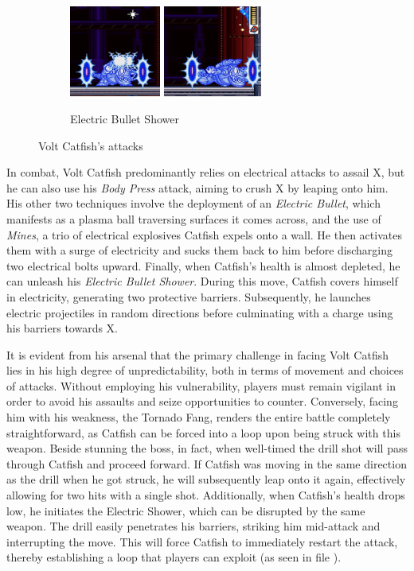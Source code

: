 \begin{figure}[htp]
	\begin{subfigure}{\linewidth}
		\centering
		\includegraphics[height=3cm]{figures/X3/Volt_catfish/catfish_dm_1.jpg}
		\includegraphics[height=3cm]{figures/X3/Volt_catfish/catfish_dm_2.jpg}
		\caption{Electric Bullet Shower}
	\end{subfigure}
	\caption{Volt Catfish's attacks}
	\end{figure}
	
In combat, Volt Catfish predominantly relies on electrical attacks to assail X, but he can also use his \emph{Body Press} attack, aiming to crush X by leaping onto him. His other two techniques involve the deployment of an \emph{Electric Bullet}, which manifests as a plasma ball traversing surfaces it comes across, and the use of \emph{Mines}, a trio of electrical explosives Catfish expels onto a wall. He then activates them with a surge of electricity and sucks them back to him before discharging two electrical bolts upward. Finally, when Catfish's health is almost depleted, he can unleash his \emph{Electric Bullet Shower}. During this move, Catfish covers himself in electricity, generating two protective barriers. Subsequently, he launches electric projectiles in random directions before culminating with a charge using his barriers towards X.


It is evident from his arsenal that the primary challenge in facing Volt Catfish lies in his high degree of unpredictability, both in terms of movement and choices of attacks. Without employing his vulnerability, players must remain vigilant in order to avoid his assaults and seize opportunities to counter. Conversely, facing him with his weakness, the Tornado Fang, renders the entire battle completely straightforward, as Catfish can be forced into a loop upon being struck with this weapon. Beside stunning the boss, in fact, when well-timed the drill shot will pass through Catfish and proceed forward. If Catfish was moving in the same direction as the drill when he got struck, he will subsequently leap onto it again, effectively allowing for two hits with a single shot. Additionally, when Catfish's health drops low, he initiates the Electric Shower, which can be disrupted by the same weapon. The drill easily penetrates his barriers, striking him mid-attack and interrupting the move. This will force Catfish to immediately restart the attack, thereby establishing a loop that players can exploit (as seen in file ).

